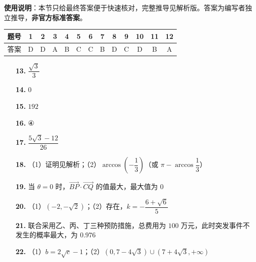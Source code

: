 
\begin{gknotice}
\textbf{使用说明}：本节只给最终答案便于快速核对，完整推导见解析版。答案为编写者独立推导，\textbf{非官方标准答案}。
\end{gknotice}

\begin{center}\begin{tabular}{ccccccccccccc}
\toprule
题号 & 1 & 2 & 3 & 4 & 5 & 6 & 7 & 8 & 9 & 10 & 11 & 12 \\
\midrule
答案 & D & D & A & B & C & C & B & D & C & D & B & A \\
\bottomrule
\end{tabular}\end{center}

\begin{itemize}[leftmargin=2.6em]
  \item[\textbf{13.}] $\dfrac{\sqrt{3}}{3}$
  \item[\textbf{14.}] $0$
  \item[\textbf{15.}] $192$
  \item[\textbf{16.}] ④
\end{itemize}

\begin{itemize}[leftmargin=2.6em]
  \item[\textbf{17.}] $\dfrac{5\sqrt{3} - 12}{26}$
  \item[\textbf{18.}] （1）证明见解析；（2）$\arccos\left(-\dfrac{1}{3}\right)$（或 $\pi - \arccos\dfrac{1}{3}$）
  \item[\textbf{19.}] 当 $\theta = 0$ 时，$\vec{BP} \cdot \vec{CQ}$ 的值最大，最大值为 $0$
  \item[\textbf{20.}] （1）$(-2, -\sqrt{2})$；（2）存在，$k = -\dfrac{6 + \sqrt{6}}{5}$
  \item[\textbf{21.}] 联合采用乙、丙、丁三种预防措施，总费用为 $100$ 万元，此时突发事件不发生的概率最大，为 $0.976$
  \item[\textbf{22.}] （1）$b = 2\sqrt{c} - 1$；（2）$(0, 7 - 4\sqrt{3}) \cup (7 + 4\sqrt{3}, +\infty)$
\end{itemize}
